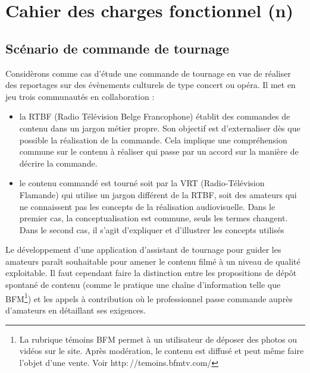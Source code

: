 



\section{Cahier des charges fonctionnel (n)}\label{sec:cdcf}


\subsection{Scénario de commande de tournage}\label{sec:scenar}
Considèrons comme cas d'étude une commande de tournage en vue de réaliser des reportages sur des évènements culturels de type concert ou opéra. 
Il met en jeu trois communautés en collaboration :

\begin{itemize}
	\item la RTBF (Radio Télévision Belge Francophone) établit des commandes de contenu dans un jargon métier propre. Son objectif est d'externaliser dès que possible la réalisation de la commande. Cela implique une compréhension commune sur le contenu à réaliser qui passe par un accord sur la manière de décrire la commande. 
	
	\item le contenu commandé est tourné soit par la VRT (Radio-Télévision Flamande) qui utilise un jargon différent de la RTBF, soit des amateurs qui ne connaissent pas les concepts de la réalisation audiovisuelle. Dans le premier cas, la conceptualisation est commune, seuls les termes changent. Dans le second cas, il s'agit d'expliquer et d'illustrer les concepts utilisés \\
\end{itemize}

Le développement d'une application d'assistant de tournage pour guider les amateurs paraît souhaitable pour amener le contenu filmé à un niveau de qualité exploitable. 
Il faut cependant faire la distinction entre les propositions de dépôt spontané de contenu (comme le pratique une chaîne d'information telle que BFM\footnote{La rubrique témoins BFM permet à un utilisateur de déposer des photos ou vidéos sur le site. 
Après modération, le contenu est diffusé et peut même faire l'objet d'une vente. Voir http$:$//temoins.bfmtv.com/}) et les appels à contribution où le professionnel passe commande auprès d'amateurs en détaillant ses exigences. 

